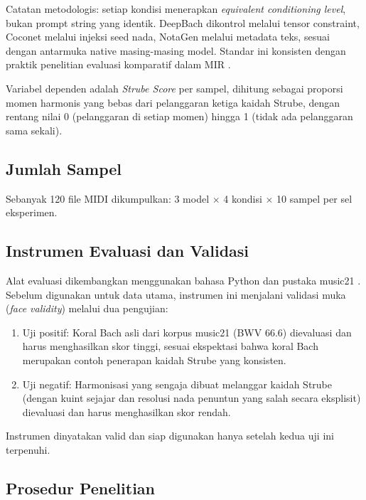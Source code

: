 Catatan metodologis: setiap kondisi menerapkan \textit{equivalent conditioning level}, bukan prompt string yang identik. DeepBach dikontrol melalui tensor constraint, Coconet melalui injeksi seed nada, NotaGen melalui metadata teks, sesuai dengan antarmuka native masing-masing model. Standar ini konsisten dengan praktik penelitian evaluasi komparatif dalam MIR \parencite{hadjeres2017, huang2017}.

Variabel dependen adalah \textit{Strube Score} per sampel, dihitung sebagai proporsi momen harmonis yang bebas dari pelanggaran ketiga kaidah Strube, dengan rentang nilai 0 (pelanggaran di setiap momen) hingga 1 (tidak ada pelanggaran sama sekali).

\subsection{Jumlah Sampel}

Sebanyak 120 file MIDI dikumpulkan: 3 model $\times$ 4 kondisi $\times$ 10 sampel per sel eksperimen.

\subsection{Instrumen Evaluasi dan Validasi}

Alat evaluasi dikembangkan menggunakan bahasa Python dan pustaka music21 \parencite{cuthbert2010}. Sebelum digunakan untuk data utama, instrumen ini menjalani validasi muka (\textit{face validity}) melalui dua pengujian:

\begin{enumerate}
    \item Uji positif: Koral Bach asli dari korpus music21 (BWV 66.6) dievaluasi dan harus menghasilkan skor tinggi, sesuai ekspektasi bahwa koral Bach merupakan contoh penerapan kaidah Strube yang konsisten.
    \item Uji negatif: Harmonisasi yang sengaja dibuat melanggar kaidah Strube (dengan kuint sejajar dan resolusi nada penuntun yang salah secara eksplisit) dievaluasi dan harus menghasilkan skor rendah.
\end{enumerate}

Instrumen dinyatakan valid dan siap digunakan hanya setelah kedua uji ini terpenuhi.

\subsection{Prosedur Penelitian}

